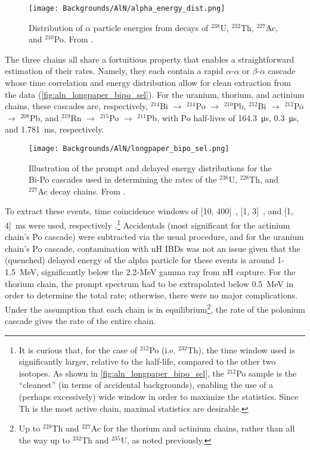 \documentclass[../thesis.tex]{subfiles}
\begin{document}
\begin{figure}[ht]
  \texttt{[image: Backgrounds/AlN/alpha\_energy\_dist.png]}
  \caption{Distribution of $\alpha$ particle energies from decays of $^{238}$U, $^{232}$Th, $^{227}$Ac, and $^{210}$Po. From \cite{Zhao_2014}.}
  \label{fig:aln_alpha_energy_dist}
\end{figure}

The three chains all share a fortuitious property that enables a straightforward estimation of their rates. Namely, they each contain a rapid $\alpha$-$\alpha$ or $\beta$-$\alpha$ cascade whose time correlation and energy distribution allow for clean extraction from the data (\autoref{fig:aln_longpaper_bipo_sel}). For the uranium, thorium, and actinium chains, these cascades are, respectively, $^{214}$Bi $\to$ $^{214}$Po $\to$ $^{210}$Pb, $^{212}$Bi $\to$ $^{212}$Po $\to$ $^{208}$Pb, and $^{219}$Rn $\to$ $^{215}$Po $\to$ $^{211}$Pb, with Po half-lives of \SI{164.3}{\micro s}, \SI{0.3}{\micro s}, and \SI{1.781}{ms}, respectively.

\begin{figure}[ht]
  \texttt{[image: Backgrounds/AlN/longpaper\_bipo\_sel.png]}
  \caption{Illustration of the prompt and delayed energy distributions for the Bi-Po cascades used in determining the rates of the $^{238}$U, $^{228}$Th, and $^{227}$Ac decay chains. From \cite{An_2017}.}
  \label{fig:aln_longpaper_bipo_sel}
\end{figure}

To extract these events, time coincidence windows of [10, 400]~\us, [1, 3]~\us, and [1, 4]~ms were used, respectively \cite{An_2017}.\footnote{It is curious that, for the case of $^{212}$Po (i.e. $^{232}$Th), the time window used is significantly larger, relative to the half-life, compared to the other two isotopes. As shown in \autoref{fig:aln_longpaper_bipo_sel}, the $^{212}$Po sample is the ``cleanest'' (in terms of accidental backgrounds), enabling the use of a (perhaps excessively) wide window in order to maximize the statistics. Since Th is the most active chain, maximal statistics are desirable.} Accidentals (most significant for the actinium chain's Po cascade) were subtracted via the usual procedure,
and for the uranium chain's Po cascade, contamination with nH IBDs was not an issue given that the (quenched) delayed energy of the alpha particle for these events is around 1-1.5~MeV, significantly below the 2.2-MeV gamma ray from nH capture. For the thorium chain, the prompt spectrum had to be extrapolated below 0.5~MeV in order to determine the total rate; otherwise, there were no major complications. Under the assumption that each chain is in equilibrium\footnote{Up to $^{228}$Th and $^{227}$Ac for the thorium and actinium chains, rather than all the way up to $^{232}$Th and $^{235}$U, as noted previously.}, the rate of the polonium cascade gives the rate of the entire chain.
\end{document}
